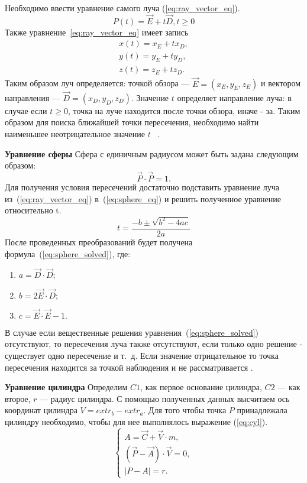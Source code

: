 Необходимо ввести уравнение самого луча (\ref{eq:ray_vector_eq}).
\begin{equation} 
	P(t) = \vec{E} +t\vec{D},t \ge 0
	\label{eq:ray_vector_eq}
\end{equation}
Также уравнение~\ref{eq:ray_vector_eq} имеет запись
\begin{equation}
	\label{eq:ray_scalar_eq}
	\begin{aligned}
		x(t) = x_E + t x_D, \\
		y(t) = y_E + t y_D, \\
		z(t) = z_E + t z_D.
	\end{aligned}
\end{equation}
Таким образом луч определяется: точкой обзора --- $\vec{E} = (x_E,y_E,z_E)$ и вектором направления --- $\vec{D} = (x_D,y_D,z_D)$. Значение $t$  определяет направление луча: в случае если $t \ge 0$,
точка на луче находится после точки обзора, иначе - за. Таким образом для поиска ближайшей точки пересечения, необходимо найти наименьшее неотрицательное значение $t$~\cite{Rodgers,primitives_raytracing_equations} .


\textbf{Уравнение сферы}
Сфера с единичным радиусом может быть задана следующим образом:
\begin{equation}
	\vec{P} \cdot \vec{P}=1.
	\label{eq:sphere_eq}
\end{equation}
Для получения условия пересечений достаточно подставить уравнение луча из~(\ref{eq:ray_vector_eq}) в~(\ref{eq:sphere_eq}) и решить полученное уравнение относительно t.
\begin{equation}
	t=\frac{-b\pm\sqrt{b^2-4ac}}{2a}
	\label{eq:sphere_solved}
\end{equation}
После проведенных преобразований будет получена формула~(\ref{eq:sphere_solved}), где:
\begin{enumerate}
	\item $a = \vec{D} \cdot \vec{D};$
	\item $b = 2\vec{E} \cdot \vec{D};$ 
	\item $c = \vec{E} \cdot \vec{E} - 1.$
\end{enumerate}
В случае если вещественные решения уравнения~(\ref{eq:sphere_solved}) отсутствуют, то пересечения луча также отсутствуют, если только одно решение  - существует одно
пересечение и т.~д. Если значение отрицательное то точка пересечения находится за точкой наблюдения и не рассматривается \cite{primitives_raytracing_equations}.

\textbf{Уравнение цилиндра}
Определим $C1$, как первое основание цилиндра, $C2$ --- как второе,
$r$ --- радиус цилиндра. С помощью полученных данных высчитаем ось координат цилиндра $V = extr_b - extr_a$.
Для того чтобы точка $P$ принадлежала цилиндру необходимо, чтобы для нее выполнялось выражение (\ref{eq:cyl}).
\begin{equation}
	\begin{cases}
	A = \vec{C} + \vec{V} \cdot m, \\
	(\vec{P} - \vec{A}) \cdot \vec{V} = 0, \\
	|P-A| = r. 
	\end{cases}
	\label{eq:cyl}
\end{equation}

